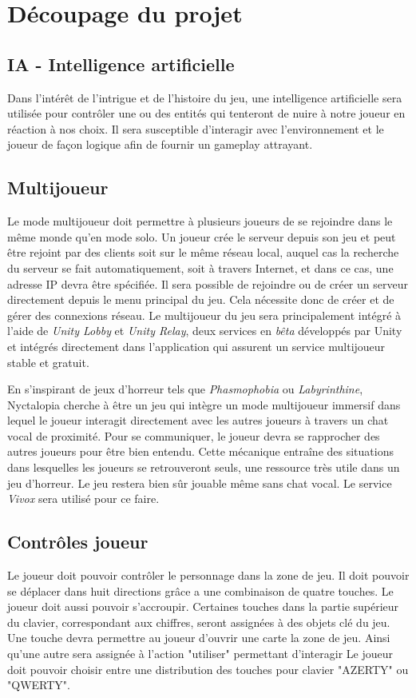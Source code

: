\section{Découpage du projet}

\subsection{IA - Intelligence artificielle}
\setlength{\parindent}{5ex}
Dans l'intérêt de l'intrigue et de l'histoire du jeu, une intelligence artificielle sera utilisée pour contrôler une ou des entités qui tenteront de nuire à notre joueur en réaction à nos choix. Il sera susceptible d'interagir avec l'environnement et le joueur de façon logique afin de fournir un gameplay attrayant.

\subsection{Multijoueur}
\setlength{\parindent}{5ex}
Le mode multijoueur doit permettre à plusieurs joueurs de se rejoindre dans
le même monde qu’en mode solo. Un joueur crée le serveur depuis son jeu et
peut être rejoint par des clients soit sur le même réseau local, auquel cas la
recherche du serveur se fait automatiquement, soit à travers Internet, et dans ce
cas, une adresse IP devra être spécifiée. Il sera possible de rejoindre ou de créer un serveur directement depuis le menu principal du jeu. Cela nécessite donc de créer et de gérer des connexions réseau. Le multijoueur du jeu sera principalement intégré à l'aide de \emph{Unity Lobby} et \emph{Unity Relay}, deux services en \emph{bêta} développés par Unity et intégrés directement dans l'application qui assurent un service multijoueur stable et gratuit.

En s'inspirant de jeux d'horreur tels que \emph{Phasmophobia} ou \emph{Labyrinthine}, Nyctalopia cherche à être un jeu qui intègre un mode multijoueur immersif dans lequel le joueur interagit directement avec les autres joueurs à travers un chat vocal de proximité. Pour se communiquer, le joueur devra se rapprocher des autres joueurs pour être bien entendu. Cette mécanique entraîne des situations dans lesquelles les joueurs se retrouveront seuls, une ressource très utile dans un jeu d'horreur. Le jeu restera bien sûr jouable même sans chat vocal. Le service \emph{Vivox} sera utilisé pour ce faire.

\subsection{Contrôles joueur}
\setlength{\parindent}{5ex}
Le joueur doit pouvoir contrôler le personnage dans la zone de jeu.
Il doit pouvoir se déplacer dans huit directions grâce a une combinaison de quatre touches.
Le joueur doit aussi pouvoir s'accroupir.
Certaines touches dans la partie supérieur du clavier, correspondant aux chiffres, seront assignées à des objets clé du jeu.
Une touche devra permettre au joueur d'ouvrir une carte la zone de jeu.
Ainsi qu'une autre sera assignée à l'action "utiliser" permettant d'interagir 
Le joueur doit pouvoir choisir entre une distribution des touches pour clavier "AZERTY" ou "QWERTY".

